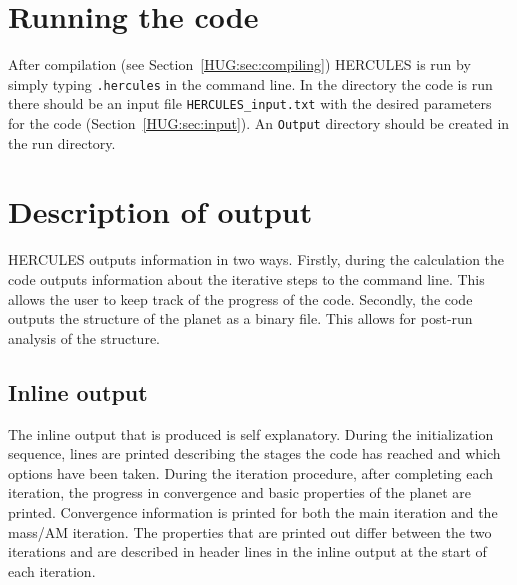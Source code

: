 \documentclass[11pt, oneside]{article}   	%
\begin{document}
\section{Running the code}
\label{HUG:sec:run}

After compilation (see Section~\ref{HUG:sec:compiling}) HERCULES is run by simply typing \texttt{.\/hercules} in the command line. 
In the directory the code is run there should be an input file \texttt{HERCULES\_input.txt} with the desired parameters for the code (Section~\ref{HUG:sec:input}).
An \texttt{Output} directory should be created in the run directory.

\section{Description of output}
\label{HUG:sec:output}

HERCULES outputs information in two ways. 
Firstly, during the calculation the code outputs information about the iterative steps to the command line. 
This allows the user to keep track of the progress of the code.
Secondly, the code outputs the structure of the planet as a binary file. 
This allows for post-run analysis of the structure.

\subsection{Inline output}

The inline output that is produced is self explanatory. 
During the initialization sequence, lines are printed describing the stages the code has reached and which options have been taken. 
During the iteration procedure, after completing each iteration, the progress in convergence and basic properties of the planet are printed. 
Convergence information is printed for both the main iteration and the mass/AM iteration. 
The properties that are printed out differ between the two iterations and are described in header lines in the inline output at the start of each iteration. 

\end{document}
